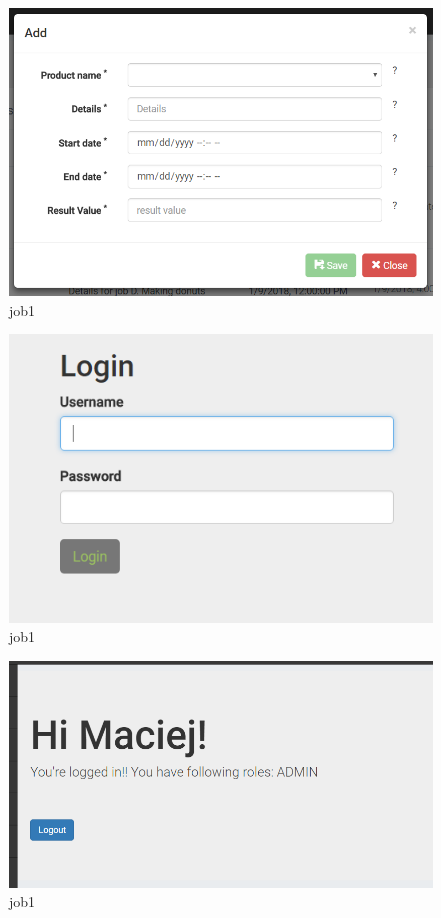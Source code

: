 \documentclass[a4paper,11pt,twoside]{report}
\theoremstyle{definition}
\begin{document}
\begin{figure}[h!]
\begin{center}
\includegraphics[width=\textwidth]{AS/jobs/2}
\end{center}
\caption{job1}
\end{figure}
\thispagestyle{empty}


\begin{figure}[h!]
\begin{center}
\includegraphics[width=\textwidth]{AS/login/1}
\end{center}
\caption{job1}
\end{figure}

\begin{figure}[h!]
\begin{center}
\includegraphics[width=\textwidth]{AS/login/2}
\end{center}
\caption{job1}
\end{figure}
\end{document}
